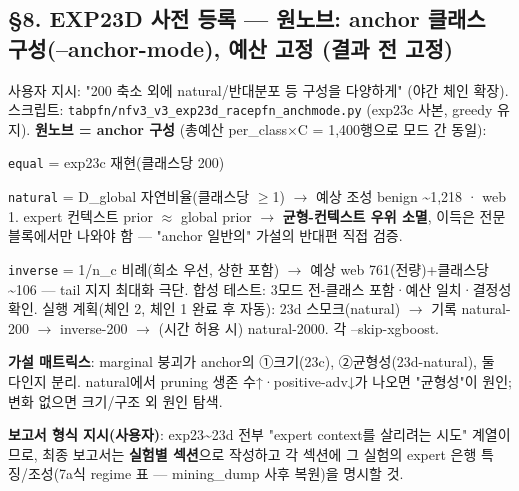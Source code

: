 \subsection{§8. EXP23D 사전 등록 — 원노브: anchor 클래스 구성(--anchor-mode), 예산 고정 (결과 전 고정)}
사용자 지시: "200 축소 외에 natural/\allowbreak{}반대분포 등 구성을 다양하게" (야간 체인 확장). 스크립트: \texttt{tabpfn/\allowbreak{}\allowbreak{}n\allowbreak{}fv3\_\allowbreak{}\allowbreak{}v3\_\allowbreak{}\allowbreak{}e\allowbreak{}xp23d\_\allowbreak{}\allowbreak{}ra\allowbreak{}cepfn\_\allowbreak{}\allowbreak{}an\allowbreak{}chmode.\allowbreak{}p\allowbreak{}y} (exp23c 사본, greedy 유지). \textbf{원노브 =\allowbreak{} anchor 구성} (총예산 per\_\allowbreak{}class×C =\allowbreak{} 1,400행으로 모드 간 동일):

\par\noindent \textbullet\enspace \texttt{equal} =\allowbreak{} exp23c 재현(클래스당 200)


\par\noindent \textbullet\enspace \texttt{natural} =\allowbreak{} D\_\allowbreak{}global 자연비율(클래스당 \ensuremath{\geq}1)  \ensuremath{\rightarrow}  예상 조성 benign \textasciitilde{}1,218 · web 1. expert 컨텍스트 prior \ensuremath{\approx} global prior  \ensuremath{\rightarrow}  \textbf{균형-컨텍스트 우위 소멸}, 이득은 전문 블록에서만 나와야 함 — "anchor 일반의" 가설의 반대편 직접 검증.


\par\noindent \textbullet\enspace \texttt{inverse} =\allowbreak{} 1/\allowbreak{}n\_\allowbreak{}c 비례(희소 우선, 상한 포함)  \ensuremath{\rightarrow}  예상 web 761(전량)+\allowbreak{}클래스당 \textasciitilde{}106 — tail 지지 최대화 극단. 합성 테스트: 3모드 전-클래스 포함·예산 일치·결정성 확인. 실행 계획(체인 2, 체인 1 완료 후 자동): 23d 스모크(natural)  \ensuremath{\rightarrow}  기록 natural-200  \ensuremath{\rightarrow}  inverse-200  \ensuremath{\rightarrow}  (시간 허용 시) natural-2000. 각 --skip-xgboost.


\textbf{가설 매트릭스}: marginal 붕괴가 anchor의 ①크기(23c), ②균형성(23d-natural), 둘 다인지 분리. natural에서 pruning 생존 수↑·positive-adv↓가 나오면 "균형성"이 원인; 변화 없으면 크기/\allowbreak{}구조 외 원인 탐색.

\textbf{보고서 형식 지시(사용자)}: exp23\textasciitilde{}23d 전부 "expert context를 살리려는 시도" 계열이므로, 최종 보고서는 \textbf{실험별 섹션}으로 작성하고 각 섹션에 그 실험의 expert 은행 특징/\allowbreak{}조성(7a식 regime 표 — mining\_\allowbreak{}dump 사후 복원)을 명시할 것.

